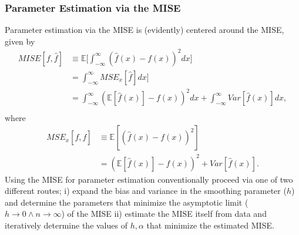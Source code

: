 \documentclass[
twoside,
openright,
titlepage,
numbers=noenddot,
headinclude,%
footinclude=true,
dottedtoc, %
ngerman,
american, %
pagesize=pdftex,
]{book}
\begin{document}
	\subsubsection{Parameter Estimation via the MISE}
	Parameter estimation via the MISE is (evidently) centered around the MISE, given by
	\begin{equation}
		\begin{split}
			MISE[f,\hat{f}]&\equiv \mathbb{E}\bigg[\int_{-\infty}^{\infty} (\hat{f}(x)-f(x))^2dx\bigg]\\
			&= \int_{-\infty}^{\infty} MSE_x[\hat{f}]dx\bigg]\\
			&= \int_{-\infty}^{\infty} (\mathbb{E}[\hat{f}(x)]-f(x))^2dx+\int_{-\infty}^{\infty}Var[\hat{f}(x)]dx,\\
		\end{split}
		\label{mse1}
	\end{equation}
	where
	\begin{equation}
		\begin{split}
			MSE_x[f,\hat{f}]&\equiv \mathbb{E}[(\hat{f}(x)-f(x))^2]\\
			&=(\mathbb{E}[\hat{f}(x)]-f(x))^2+Var[\hat{f}(x)].
		\end{split}
	\end{equation}
	Using the MISE for parameter estimation conventionally proceed via one of two different routes; i) expand the bias and variance in the smoothing parameter ($h$) and determine the parameters that minimize the asymptotic limit ($h\rightarrow 0\wedge  n\rightarrow \infty$) of the MISE ii) estimate the MISE itself from data and iteratively determine the values of $h,\alpha$ that minimize the estimated MISE.  
	
\end{document}
